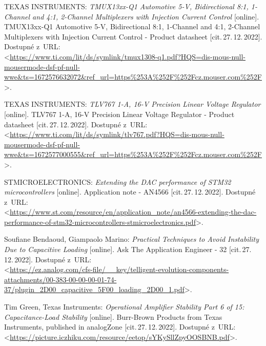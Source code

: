 \begin{thebibliography}{99}
    TEXAS INSTRUMENTS:
    \emph{TMUX13xx-Q1 Automotive 5-V, Bidirectional 8:1, 1-Channel and 4:1, 2-Channel
    Multiplexers with Injection Current Control}\/ [online].
    TMUX13xx-Q1 Automotive 5-V, Bidirectional 8:1, 1-Channel and 4:1, 2-Channel
    Multiplexers with Injection Current Control - Product datasheet [cit.\,27.\,12.\,2022].
    Dostupné z~URL:\\
    <\url{https://www.ti.com/lit/ds/symlink/tmux1308-q1.pdf?HQS=dis-mous-null-mousermode-dsf-pf-null-wwe&ts=1672576632072&ref_url=https%253A%252F%252Fcz.mouser.com%252F}>.

    TEXAS INSTRUMENTS:
    \emph{TLV767 1-A, 16-V Precision Linear Voltage Regulator}\/ [online].
    TLV767 1-A, 16-V Precision Linear Voltage Regulator - Product datasheet [cit.\,27.\,12.\,2022].
    Dostupné z~URL:\\
    <\url{https://www.ti.com/lit/ds/symlink/tlv767.pdf?HQS=dis-mous-null-mousermode-dsf-pf-null-wwe&ts=1672577000555&ref_url=https%253A%252F%252Fcz.mouser.com%252F}>.

    STMICROELECTRONICS:
    \emph{Extending the DAC performance of STM32 microcontrollers}\/ [online].
    Application note - AN4566 [cit.\,27.\,12.\,2022].
    Dostupné z~URL:\\
    <\url{https://www.st.com/resource/en/application_note/an4566-extending-the-dac-performance-of-stm32-microcontrollers-stmicroelectronics.pdf}>.

    Soufiane Bendaoud, Giampaolo Marino:
    \emph{Practical Techniques to Avoid Instability Due to Capacitive Loading}\/ [online].
    Ask The Application Engineer - 32 [cit.\,27.\,12.\,2022].
    Dostupné z~URL:\\
    <\url{https://ez.analog.com/cfs-file/__key/telligent-evolution-components-attachments/00-383-00-00-00-01-74-37/plugin_2D00_capacitive_5F00_loading_2D00_1.pdf}>.

    Tim Green, Texas Instruments:
    \emph{Operational Amplifier Stability Part 6 of 15: Capacitance-Load Stability}\/ [online].
    Burr-Brown Products from Texas Instruments, published in analogZone [cit.\,27.\,12.\,2022].
    Dostupné z~URL:\\
    <\url{https://picture.iczhiku.com/resource/eetop/sYKySllZpyOOSBNB.pdf}>.

\end{thebibliography}


%
%
%
